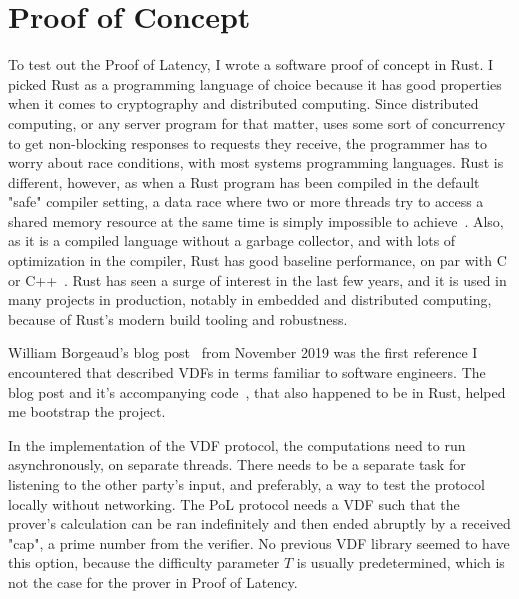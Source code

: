 

\chapter{Proof of Concept}
\label{Proof of Concept}
To test out the Proof of Latency, I wrote a software proof of concept in Rust. I picked Rust as a programming language of choice because it has good properties when it comes to cryptography and distributed computing. Since distributed computing, or any server program for that matter, uses some sort of concurrency to get non-blocking responses to requests they receive, the programmer has to worry about race conditions, with most systems programming languages. Rust is different, however, as when a Rust program has been compiled in the default "safe" compiler setting, a data race where two or more threads try to access a shared memory resource at the same time is simply impossible to achieve~\cite{The_Rust_Project_Developers2018-xh}. Also, as it is a compiled language without a garbage collector, and with lots of optimization in the compiler, Rust has good baseline performance, on par with C or C++~\cite{Howarth2020-zc}. Rust has seen a surge of interest in the last few years, and it is used in many projects in production, notably in embedded and distributed computing, because of Rust's modern build tooling and robustness.

William Borgeaud's blog post~\cite{Borgeaud2019-wk} from November 2019 was the first reference I encountered that described VDFs in terms familiar to software engineers. The blog post and it's accompanying code~\cite{Borgeaud2019-wk}, that also happened to be in Rust, helped me bootstrap the project.

In the implementation of the VDF protocol, the computations need to run asynchronously, on separate threads. There needs to be a separate task for listening to the other party's input, and preferably, a way to test the protocol locally without networking. The PoL protocol needs a VDF such that the prover's calculation can be ran indefinitely and then ended abruptly by a received "cap", a prime number from the verifier. No previous VDF library seemed to have this option, because the difficulty parameter \(T\) is usually predetermined, which is not the case for the prover in Proof of Latency.

